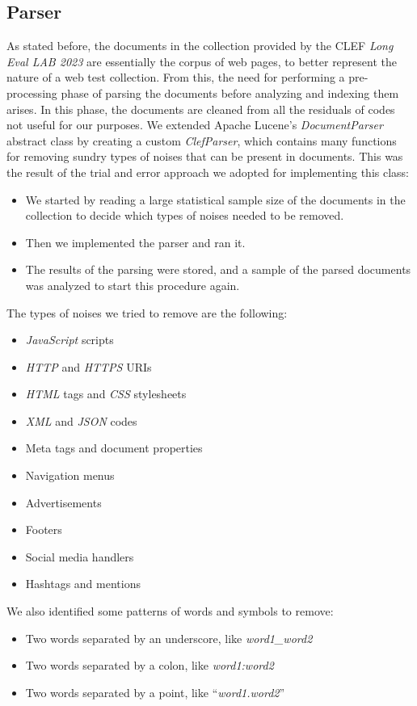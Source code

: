 \subsection{Parser}
As stated before, the documents in the collection provided by the \ac{CLEF} \textit{Long Eval LAB 2023} are essentially the corpus of web pages, to better represent the nature of a web test collection. From this, the need for performing a pre-processing phase of parsing the documents before analyzing and indexing them arises.
In this phase, the documents are cleaned from all the residuals of codes not useful for our purposes. We extended Apache Lucene's \textit{DocumentParser} abstract class by creating a custom \textit{ClefParser}, which contains many functions for removing sundry types of noises that can be present in documents. This was the result of the trial and error approach we adopted for implementing this class:
\begin{itemize}
\item We started by reading a large statistical sample size of the documents in the collection to decide which types of noises needed to be removed.
\item Then we implemented the parser and ran it.
\item The results of the parsing were stored, and a sample of the parsed documents was analyzed to start this procedure again.
\end{itemize}
The types of noises we tried to remove are the following:
\begin{itemize}
\item \textit{JavaScript} scripts
\item \textit{HTTP} and \textit{HTTPS} URIs
\item \textit{HTML} tags and \textit{CSS} stylesheets
\item \textit{XML} and \textit{JSON} codes
\item Meta tags and document properties
\item Navigation menus
\item Advertisements
\item Footers
\item Social media handlers
\item Hashtags and mentions
\end{itemize}
We also identified some patterns of words and symbols to remove:
\begin{itemize}
\item Two words separated by an underscore, like \textit{word1\_word2}
\item Two words separated by a colon, like \textit{word1:word2}
\item Two words separated by a point, like ``\textit{word1.word2}''
\end{itemize}
